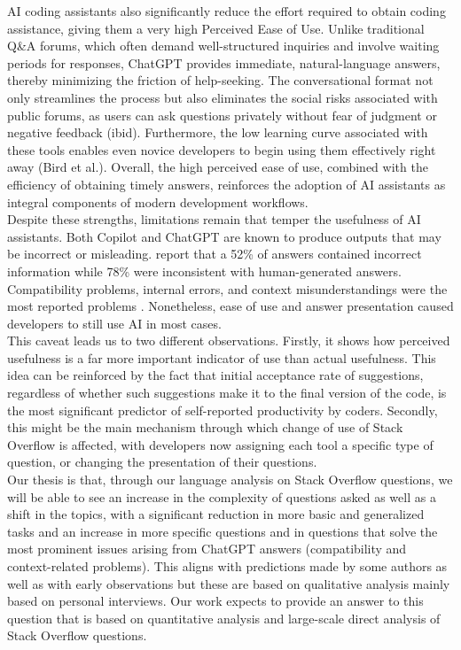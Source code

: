 AI coding assistants also significantly reduce the effort required to obtain coding assistance, giving them a very high Perceived Ease of Use. Unlike traditional Q\&A forums, which often demand well-structured inquiries and involve waiting periods for responses, ChatGPT provides immediate, natural-language answers, thereby minimizing the friction of help-seeking. The conversational format not only streamlines the process but also eliminates the social risks associated with public forums, as users can ask questions privately without fear of judgment or negative feedback (ibid). Furthermore, the low learning curve associated with these tools enables even novice developers to begin using them effectively right away (Bird et al.). Overall, the high perceived ease of use, combined with the efficiency of obtaining timely answers, reinforces the adoption of AI assistants as integral components of modern development workflows. \\

Despite these strengths, limitations remain that temper the usefulness of AI assistants. Both Copilot and ChatGPT are known to produce outputs that may be incorrect or misleading. \textcite{kabir_is_2023} report that a 52\% of answers contained incorrect information  while 78\% were inconsistent with human-generated answers. Compatibility problems, internal errors, and context misunderstandings were the most reported problems \parencite{zhou_exploring_2025}. Nonetheless, ease of use and answer presentation caused developers to still use AI in most cases. \\

This caveat leads us to two different observations. Firstly, it shows how perceived usefulness is a far more important indicator of use than actual usefulness. This idea can be reinforced by the fact that initial acceptance rate of suggestions, regardless of whether such suggestions make it to the final version of the code, is the most significant predictor of self-reported productivity by coders. Secondly, this might be the main mechanism through which change of use of Stack Overflow is affected, with developers now assigning each tool a specific type of question, or changing the presentation of their questions. \\

Our thesis is that, through our language analysis on Stack Overflow questions, we will be able to see an increase in the complexity of questions asked as well as a shift in the topics, with a significant reduction in more basic and generalized tasks and an increase in more specific questions and in questions that solve the most prominent issues arising from ChatGPT answers (compatibility and context-related problems). This aligns with predictions made by some authors as well as with early observations \parencite{kabir_is_2023, sergeyuk_using_2025, zhou_exploring_2025} but these are based on qualitative analysis mainly based on personal interviews. Our work expects to provide an answer to this question that is based on quantitative analysis and large-scale direct analysis of Stack Overflow questions.